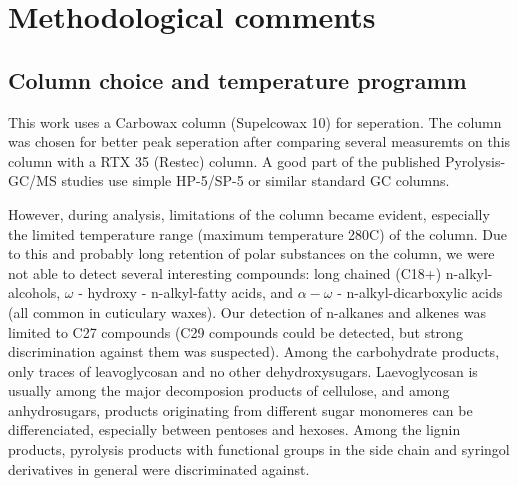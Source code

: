 % 
% 
% 
% 
% 

\chapter{Methodological comments}

\section{Column choice and temperature programm}
This work uses a Carbowax column (Supelcowax 10) for seperation. The column was chosen for better peak seperation after comparing several measuremts on this column with a RTX 35 (Restec) column. A good part of the published Pyrolysis-GC/MS studies use simple HP-5/SP-5 or similar standard GC columns.

However, during analysis, limitations of the column became evident, especially the limited temperature range (maximum temperature 280\textdegree C) of the column. Due to this and probably long retention of polar substances on the column, we were not able to detect several interesting compounds: long chained (C18+) n-alkyl-alcohols, $\omega$ - hydroxy - n-alkyl-fatty acids, and $\alpha - \omega$ - n-alkyl-dicarboxylic acids (all common in cuticulary waxes). Our detection of n-alkanes and alkenes was limited to C27 compounds (C29 compounds could be detected, but strong discrimination against them was suspected). Among the carbohydrate products, only traces of leavoglycosan and no other dehydroxysugars. Laevoglycosan is usually among the major decomposion products of cellulose, and among anhydrosugars, products originating from different sugar monomeres can be differenciated, especially between pentoses and hexoses. 
Among the lignin products, pyrolysis products with functional groups in the side chain and syringol derivatives in general were discriminated against. 

